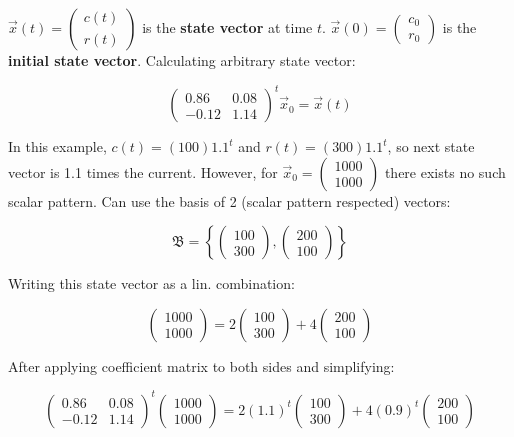 $\vec{x}(t)=\left(\begin{array}{l}c(t) \\r(t)\end{array}\right)$
is the \textbf{state vector} at time $t$. $\vec{x}(0)=\left(\begin{array}{l}c_{0} \\r_{0}\end{array}\right)$
is the \textbf{initial state vector}. Calculating arbitrary state vector:

\[\left(\begin{array}{cc}
    0.86 & 0.08 \\
    -0.12 & 1.14
    \end{array}\right)^{t} \vec{x}_{0}=\vec{x}(t)\]

In this example, $c(t)=(100) 1.1^{t}$ and $r(t)=(300) 1.1^{t}$, so next
state vector is 1.1 times the current. However, for $\vec{x}_{0}=\left(\begin{array}{c}1000 \\1000\end{array}\right)$
there exists no such scalar pattern. Can use the basis of 2 (scalar pattern respected) vectors:

\[\mathfrak{B}=\left\{\left(\begin{array}{l}
    100 \\
    300
    \end{array}\right),\left(\begin{array}{l}
    200 \\
    100
    \end{array}\right)\right\}\]

Writing this state vector as a lin. combination:

\[\left(\begin{array}{l}
    1000 \\
    1000
    \end{array}\right)=2\left(\begin{array}{l}
    100 \\
    300
    \end{array}\right)+4\left(\begin{array}{l}
    200 \\
    100
    \end{array}\right)\]

After applying coefficient matrix to both sides and simplifying:

\[\left(\begin{array}{cc}
    0.86 & 0.08 \\
    -0.12 & 1.14
    \end{array}\right)^{t}\left(\begin{array}{c}
    1000 \\
    1000
    \end{array}\right)=2(1.1)^{t}\left(\begin{array}{c}
    100 \\
    300
    \end{array}\right)+4(0.9)^{t}\left(\begin{array}{c}
    200 \\
    100
    \end{array}\right)\]

